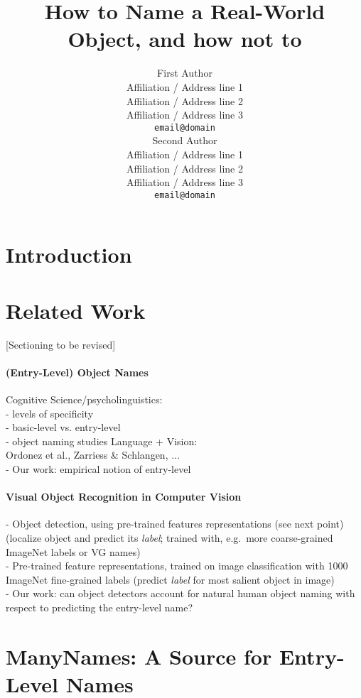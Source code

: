 \documentclass[11pt,a4paper]{article}
\title{How to Name a Real-World Object, and how not to}
\author{First Author \\
  Affiliation / Address line 1 \\
  Affiliation / Address line 2 \\
  Affiliation / Address line 3 \\
  \texttt{email@domain} \\\And
  Second Author \\
  Affiliation / Address line 1 \\
  Affiliation / Address line 2 \\
  Affiliation / Address line 3 \\
  \texttt{email@domain} \\}
\date{}
\begin{document}
\maketitle
\begin{abstract}

\end{abstract}

\section{Introduction}
\label{sec:intro}


\section{Related Work}
\label{sec:related}
%

[Sectioning to be revised]

\paragraph{(Entry-Level) Object Names}
Cognitive Science/psycholinguistics:\\
- levels of specificity\\
- basic-level vs. entry-level\\
- object naming studies
Language + Vision:\\
Ordonez et al., Zarriess \& Schlangen, ... \\
- Our work: empirical notion of entry-level

\paragraph{Visual Object Recognition in Computer Vision}
- Object detection, using pre-trained features representations (see next point) (localize object and predict its \textit{label}; trained with, e.g.\ more coarse-grained ImageNet labels or VG names)\\
- Pre-trained feature representations, trained on image classification with 1000 ImageNet fine-grained labels (predict \textit{label} for most salient object in image)\\
- Our work: can object detectors account for natural human object naming with respect to predicting the entry-level name? 


\section{ManyNames: A Source for Entry-Level Names}
\label{sec:manynames}

\end{document}
